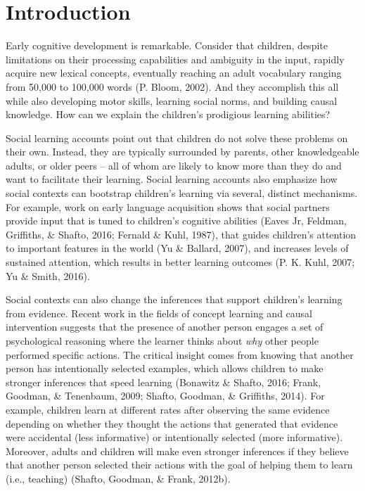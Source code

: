 \documentclass[oneside]{report}
\begin{document}
\section{Introduction}\label{introduction}

Early cognitive development is remarkable. Consider that children,
despite limitations on their processing capabilities and ambiguity in
the input, rapidly acquire new lexical concepts, eventually reaching an
adult vocabulary ranging from 50,000 to 100,000 words (P. Bloom, 2002).
And they accomplish this all while also developing motor skills,
learning social norms, and building causal knowledge. How can we explain
the children's prodigious learning abilities?

Social learning accounts point out that children do not solve these
problems on their own. Instead, they are typically surrounded by
parents, other knowledgeable adults, or older peers -- all of whom are
likely to know more than they do and want to facilitate their learning.
Social learning accounts also emphasize how social contexts can
bootstrap children's learning via several, distinct mechanisms. For
example, work on early language acquisition shows that social partners
provide input that is tuned to children's cognitive abilities (Eaves Jr,
Feldman, Griffiths, \& Shafto, 2016; Fernald \& Kuhl, 1987), that guides
children's attention to important features in the world (Yu \& Ballard,
2007), and increases levels of sustained attention, which results in
better learning outcomes (P. K. Kuhl, 2007; Yu \& Smith, 2016).

Social contexts can also change the inferences that support children's
learning from evidence. Recent work in the fields of concept learning
and causal intervention suggests that the presence of another person
engages a set of psychological reasoning where the learner thinks about
\emph{why} other people performed specific actions. The critical insight
comes from knowing that another person has intentionally selected
examples, which allows children to make stronger inferences that speed
learning (Bonawitz \& Shafto, 2016; Frank, Goodman, \& Tenenbaum, 2009;
Shafto, Goodman, \& Griffiths, 2014). For example, children learn at
different rates after observing the same evidence depending on whether
they thought the actions that generated that evidence were accidental
(less informative) or intentionally selected (more informative).
Moreover, adults and children will make even stronger inferences if they
believe that another person selected their actions with the goal of
helping them to learn (i.e., teaching) (Shafto, Goodman, \& Frank,
2012b).
\end{document}
